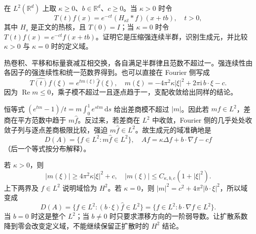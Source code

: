 \begin{exercise}\label{b2:ex:app-D-3}
在 \(L^2(\mathbb R^d)\) 上取 \(\kappa\geq0\)、\(b\in\mathbb R^d\)、\(c\geq0\)。当 \(\kappa>0\) 时令
\[
 T(t)f(x)=e^{-ct}(H_{\kappa t}*f)(x+tb),\quad t>0,
\]
其中 \(H_s\) 是正文的热核，且 \(T(0)=I\)；当 \(\kappa=0\) 时令 \(T(t)f(x)=e^{-ct}f(x+tb)\)。证明它是压缩强连续半群，识别生成元，并比较 \(\kappa>0\) 与 \(\kappa=0\) 时的定义域。
\end{exercise}
\begin{solution}
热卷积、平移和标量衰减互相交换，各自满足半群律且范数不超过一。强连续性由各因子的强连续性和统一范数界得到。也可以直接在 Fourier 侧写成
\[
 \widehat{T(t)f}(\xi)=e^{t m(\xi)}\widehat f(\xi),\quad
 m(\xi)=-4\pi^2\kappa|\xi|^2+2\pi\mathrm i\,b\cdot\xi-c.
\]
因为 \(\operatorname{Re}m\leq0\)，乘子模不超过一且逐点趋于一，支配收敛给出同样的结论。

恒等式 \((e^{tm}-1)/t=m\int_0^1e^{stm}\,\mathrm ds\) 给出差商模不超过 \(|m|\)。因此若 \(m\widehat f\in L^2\)，差商在平方范数中趋于 \(m\widehat f\)。反过来，若差商在 \(L^2\) 中收敛，Fourier 侧的几乎处处收敛子列与逐点差商极限比较，强迫 \(m\widehat f\in L^2\)。故生成元的域准确地是
\[
 D(A)=\{f\in L^2:m\widehat f\in L^2\},\quad
 Af=\kappa\Delta f+b\cdot\nabla f-cf
\]
（后一个等式按分布解释）。

若 \(\kappa>0\)，则
\[
 |m(\xi)|\geq4\pi^2\kappa|\xi|^2+c,
 \quad |m(\xi)|\leq C_{\kappa,b,c}(1+|\xi|^2).
\]
上下两界及 \(f\in L^2\) 说明域恰为 \(H^2\)。若 \(\kappa=0\)，则
\(|m|^2=c^2+4\pi^2|b\cdot\xi|^2\)，所以域变成
\[
 D(A)=\{f\in L^2:(b\cdot\xi)\widehat f\in L^2\}
      =\{f\in L^2:b\cdot\nabla f\in L^2\}.
\]
当 \(b=0\) 时这是整个 \(L^2\)；当 \(b\ne0\) 时只要求漂移方向的一阶弱导数。让扩散系数降到零会改变定义域，不能继续保留正扩散时的 \(H^2\) 结论。
\end{solution}

